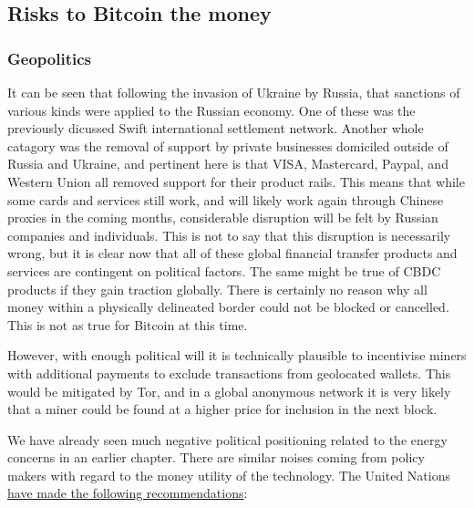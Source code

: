 \subsection{Risks to Bitcoin the money}
\subsubsection{Geopolitics}
It can be seen that following the invasion of Ukraine by Russia, that sanctions of various kinds were applied to the Russian economy. One of these was the previously dicussed Swift international settlement network. Another whole catagory was the removal of support by private businesses domiciled outside of Russia and Ukraine, and pertinent here is that VISA, Mastercard, Paypal, and Western Union all removed support for their product rails. This means that while some cards and services still work, and will likely work again through Chinese proxies in the coming months, considerable disruption will be felt by Russian companies and individuals. This is not to say that this disruption is necessarily wrong, but it is clear now that all of these global financial transfer products and services are contingent on political factors. The same might be true of CBDC products if they gain traction globally. There is certainly no reason why all money within a physically delineated border could not be blocked or cancelled. This is not as true for Bitcoin at this time. \par 
However, with enough political will it is technically plausible to incentivise miners with additional payments to exclude transactions from geolocated wallets. This would be mitigated by Tor, and in a global anonymous network it is very likely that a miner could be found at a higher price for inclusion in the next block. \par
We have already seen much negative political positioning related to the energy concerns in an earlier chapter. There are similar noises coming from policy makers with regard to the money utility of the technology. The United Nations \href{https://unctad.org/system/files/official-document/presspb2022d8_en.pdf}{have made the following recommendations}:
